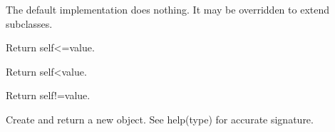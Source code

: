 \documentclass[a4paper,10pt,french]{sphinxmanual}
\begin{document}
\begin{fulllineitems}
\begin{fulllineitems}
The default implementation does nothing. It may be
overridden to extend subclasses.

\end{fulllineitems}


\begin{fulllineitems}
\label{\detokenize{road_objects/graphical_item:road_objects.graphical_item.GraphicalItem.__le__}}
Return self\textless{}=value.

\end{fulllineitems}


\begin{fulllineitems}
\label{\detokenize{road_objects/graphical_item:road_objects.graphical_item.GraphicalItem.__lt__}}
Return self\textless{}value.

\end{fulllineitems}


\begin{fulllineitems}
\label{\detokenize{road_objects/graphical_item:road_objects.graphical_item.GraphicalItem.__module__}}
\end{fulllineitems}


\begin{fulllineitems}
\label{\detokenize{road_objects/graphical_item:road_objects.graphical_item.GraphicalItem.__ne__}}
Return self!=value.

\end{fulllineitems}


\begin{fulllineitems}
\label{\detokenize{road_objects/graphical_item:road_objects.graphical_item.GraphicalItem.__new__}}
Create and return a new object.  See help(type) for accurate signature.


\end{fulllineitems}
\end{fulllineitems}
\end{document}
